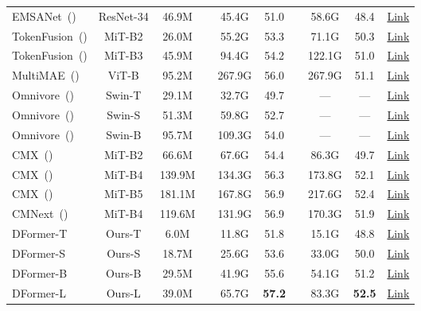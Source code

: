 \documentclass{article}
\newcommand{\highlight}[1]{\textbf{\textcolor{BrickRed}{#1}}}
\newcommand{\nMethod}{DFormer}
\begin{document}
\begin{table}[tp]
\begin{tabular}{lccccccccc}
        EMSANet~(\citeauthor{seichter2022efficient})&ResNet-34&46.9M&&45.4G&51.0&&58.6G&48.4&\href{https://github.com/TUI-NICR/EMSANet}{Link}\\ 
TokenFusion~(\citeauthor{wang2022multimodal})& MiT-B2&26.0M&&55.2G&53.3&&71.1G&50.3&\href{https://github.com/yikaiw/TokenFusion}{Link}\\
        TokenFusion~(\citeauthor{wang2022multimodal}) &MiT-B3&45.9M&&94.4G&54.2&&122.1G&51.0&\href{https://github.com/yikaiw/TokenFusion}{Link}\\
        MultiMAE~(\citeauthor{bachmann2022multimae})&ViT-B&95.2M&&267.9G&56.0&&267.9G&51.1&\href{https://github.com/EPFL-VILAB/MultiMAE}{Link}\\
        Omnivore~(\citeauthor{girdhar2022omnivore})&Swin-T&29.1M&&32.7G&49.7&&---&---&\href{https://github.com/facebookresearch/omnivore}{Link}\\
        Omnivore~(\citeauthor{girdhar2022omnivore})&Swin-S&51.3M&&59.8G&52.7&&---&---&\href{https://github.com/facebookresearch/omnivore}{Link}\\
        Omnivore~(\citeauthor{girdhar2022omnivore})&Swin-B&95.7M&&109.3G&54.0&&---&---&\href{https://github.com/facebookresearch/omnivore}{Link}\\
        CMX~(\citeauthor{zhang2022cmx})&MiT-B2&66.6M&&67.6G&54.4&&86.3G&49.7&\href{https://github.com/huaaaliu/RGBX_Semantic_Segmentation}{Link}\\
        CMX~(\citeauthor{zhang2022cmx})&MiT-B4&139.9M&&134.3G&56.3&&173.8G&52.1&\href{https://github.com/huaaaliu/RGBX_Semantic_Segmentation}{Link}\\
        CMX~(\citeauthor{zhang2022cmx})&MiT-B5&181.1M&&167.8G&56.9&&217.6G&52.4&\href{https://github.com/huaaaliu/RGBX_Semantic_Segmentation}{Link}\\
        CMNext~(\citeauthor{zhang2023delivering})&MiT-B4&119.6M&&131.9G&56.9&&170.3G&51.9&\href{https://github.com/jamycheung/DELIVER}{Link}\\
\midrule
        \rowcolor{gray!15}\nMethod{}-T &Ours-T&6.0M&& 11.8G&51.8&&15.1G&48.8&\href{https://github.com/HVision-NKU}{Link} \\
        \rowcolor{gray!15}\nMethod{}-S &Ours-S&18.7M& &25.6G&53.6 &&33.0G&50.0&\href{https://github.com/HVision-NKU}{Link}\\
        \rowcolor{gray!15} \nMethod{}-B&Ours-B&29.5M& &41.9G&55.6&&54.1G&51.2&\href{https://github.com/HVision-NKU}{Link}\\
        \rowcolor{gray!15}\nMethod{}-L&Ours-L&39.0M& &65.7G&\textbf{\highlight{57.2}}&&83.3G&\highlight{52.5}&\href{https://github.com/HVision-NKU}{Link} \\
        \bottomrule
        \end{tabular}
    
    \hspace{\fill}
    \hspace{\fill}


\vspace{-10pt}
\end{table} \label{tab:rgbd_sota}
\end{document}
